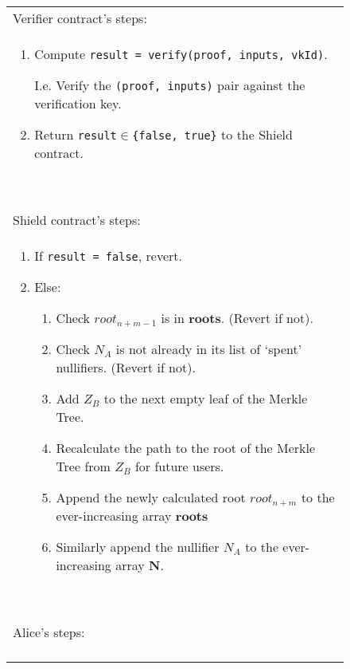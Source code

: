 \documentclass{article}
\newcounter{ongoingEnumCounter}%
\begin{document}
\begin{figure}[H]
  \ContinuedFloat %
	\begin{center}
		\begin{framed}
      \begin{tabular}{p{16cm}}
        Verifier contract's steps:\\
        \begin{enumerate}
          \setcounter{enumi}{\value{ongoingEnumCounter}}
          \item Compute \texttt{result = verify(proof, inputs, vkId)}.

          I.e. Verify the \texttt{(proof, inputs)} pair against the verification key.
          \item Return \texttt{result}$\in$\texttt{\{false, true\}} to the Shield contract.
          \setcounter{ongoingEnumCounter}{\value{enumi}}
        \end{enumerate}
        \ \\
        \hline
        Shield contract's steps:\\
        \begin{enumerate}
          \setcounter{enumi}{\value{ongoingEnumCounter}}
          \item If \texttt{result = false}, revert.
          \item Else:
          \begin{enumerate}
            \item Check $root_{n+m-1}$ is in $\bm{roots}$. (Revert if not).
            \item Check $N_A$ is not already in its list of `spent' nullifiers. (Revert if not).
            \item Add $Z_B$ to the next empty leaf of the Merkle Tree.
            \item Recalculate the path to the root of the Merkle Tree from $Z_B$ for future users.
            \item Append the newly calculated root $root_{n+m}$ to the ever-increasing array $\bm{roots}$
            \item Similarly append the nullifier $N_{A}$ to the ever-increasing array $\bm N$.
          \end{enumerate}
          \setcounter{ongoingEnumCounter}{\value{enumi}}
        \end{enumerate}
        \ \\
        \hline
        Alice's steps:\\
        \begin{enumerate}

\end{enumerate}
\end{tabular}
\end{framed}
\end{center}
\end{figure}
\end{document}
